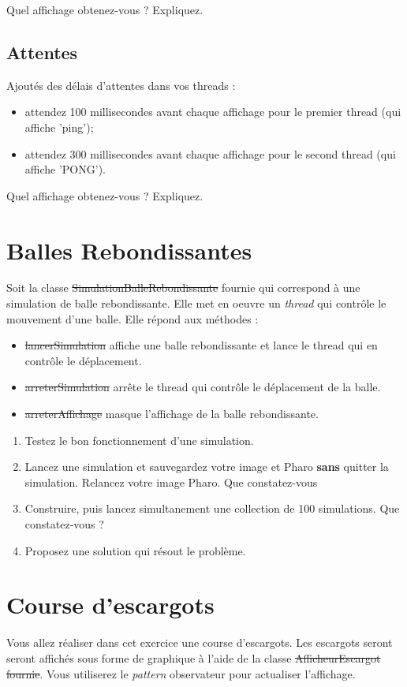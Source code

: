 \documentclass[12pt]{article}
\begin{document}
Quel affichage obtenez-vous ? Expliquez.

\subsection{Attentes}
Ajoutés des délais d'attentes dans vos threads :
\begin{itemize}
	\item attendez 100 millisecondes avant chaque affichage pour le premier thread (qui affiche 'ping');
	\item attendez 300 millisecondes avant chaque affichage pour le second thread (qui affiche 'PONG').	
\end{itemize}

Quel affichage obtenez-vous ? Expliquez.


\section{Balles Rebondissantes}
Soit la classe \st{SimulationBalleRebondissante} fournie qui correspond à une simulation de balle rebondissante.
Elle met en oeuvre un \emph{thread} qui contrôle le mouvement d'une balle.
Elle répond aux méthodes :
\begin{itemize}
	\item \st{lancerSimulation} affiche une balle rebondissante et lance le thread qui en contrôle le déplacement.
	\item \st{arreterSimulation} arrête le thread qui contrôle le déplacement de la balle.
	\item \st{arreterAffichage} masque l'affichage de la balle rebondissante.
\end{itemize}

\begin{enumerate}
	\item Testez le bon fonctionnement d'une simulation. 
	\item Lancez une simulation et sauvegardez votre image et Pharo \textbf{sans} quitter la simulation. Relancez votre image Pharo. Que constatez-vous
	\item Construire, puis lancez simultanement une collection de 100 simulations. Que constatez-vous ? 
	\item Proposez une solution qui résout le problème.
\end{enumerate}


\section{Course d'escargots}
Vous allez réaliser dans cet exercice une course d'escargots. 
Les escargots seront seront affichés sous forme de graphique à l'aide de la classe \st{AfficheurEscargot fournie}.
Vous utiliserez le \emph{pattern} observateur pour actualiser l'affichage.
\end{document}
